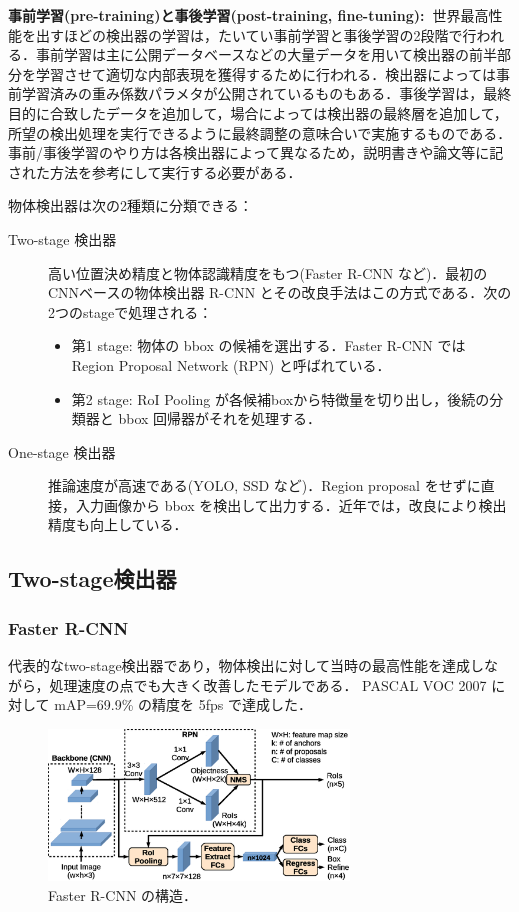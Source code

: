 \documentclass[originalpaper]{jsaiart}     %
\begin{document}
{\bf 事前学習(pre-training)と事後学習(post-training, fine-tuning):\ }世界最高性能を出すほどの検出器の学習は，たいてい事前学習と事後学習の2段階で行われる．事前学習は主に公開データベースなどの大量データを用いて検出器の前半部分を学習させて適切な内部表現を獲得するために行われる．検出器によっては事前学習済みの重み係数パラメタが公開されているものもある．事後学習は，最終目的に合致したデータを追加して，場合によっては検出器の最終層を追加して，所望の検出処理を実行できるように最終調整の意味合いで実施するものである．事前/事後学習のやり方は各検出器によって異なるため，説明書きや論文等に記された方法を参考にして実行する必要がある．

物体検出器は次の2種類に分類できる\cite{JZLYLFQ19}：
\begin{description}
    \item[Two-stage 検出器] 高い位置決め精度と物体認識精度をもつ(Faster R-CNN など)．最初のCNNベースの物体検出器 R-CNN とその改良手法はこの方式である．次の2つのstageで処理される：
    \begin{itemize}
        \item 第1 stage: 物体の bbox の候補を選出する．Faster R-CNN では Region Proposal Network (RPN) と呼ばれている．
        \item 第2 stage: RoI Pooling が各候補boxから特徴量を切り出し，後続の分類器と bbox 回帰器がそれを処理する．
    \end{itemize}
    \item[One-stage 検出器] 推論速度が高速である(YOLO, SSD など)．Region proposal をせずに直接，入力画像から bbox を検出して出力する．近年では，改良により検出精度も向上している．
\end{description}

\subsection{Two-stage検出器}
\subsubsection{Faster R-CNN}
代表的なtwo-stage検出器であり，物体検出に対して当時の最高性能を達成しながら，処理速度の点でも大きく改善したモデルである\cite{RHGS15}．
PASCAL VOC 2007 に対して mAP=69.9\% の精度を 5fps で達成した．
\begin{figure}[tb]
    \begin{center}
        \includegraphics[width=8cm,clip]{fig/archi_FasterRCNN.eps}
    \end{center}
    \caption{ Faster R-CNN の構造．}
    \label{fig:archi_FasterRCNN}
\end{figure}
\end{document}
